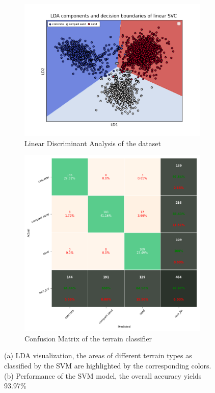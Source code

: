 \documentclass{article}
\begin{document}
\begin{figure}[!htb]
    \centering
    \begin{subfigure}[t]{0.48\textwidth}
        \includegraphics[width=\textwidth]{../figures/boundary_LDA_prevTesting_all_sand_concrete_compactsand.png}
        \caption{Linear Discriminant Analysis of the dataset}
    \end{subfigure}
    \begin{subfigure}[t]{0.48\textwidth}
        \includegraphics[trim={0 0 0 0},clip,width=\textwidth]{../figures/confusionmatrix_Train.png}
        \caption{Confusion Matrix of the terrain classifier}
    \end{subfigure}
    \caption{(a) LDA visualization, the areas of different terrain types as classified by the SVM are highlighted by the corresponding colors. (b) Performance of the SVM model, the overall accuracy yields 93.97\% }
    \label{fig:offline-class}
\end{figure}
\end{document}
